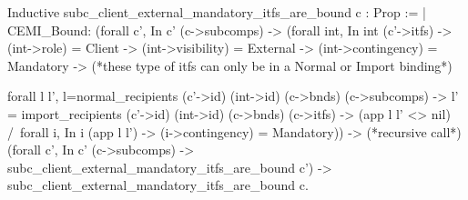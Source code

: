 Inductive subc_client_external_mandatory_itfs_are_bound c : Prop :=
 | CEMI_Bound: 
 (forall c', In c' (c->subcomps) -> 
  (forall int, In int (c'->itfs) -> (int->role) = Client ->
  (int->visibility) = External -> (int->contingency) = Mandatory ->
  (*these type of itfs can only be in a Normal or Import binding*)
  
  forall l l',
   l=normal_recipients (c'->id) (int->id) (c->bnds) (c->subcomps) ->
   l' = import_recipients (c'->id) (int->id)  (c->bnds) (c->itfs) ->
   (app l l' <> nil) /\
   forall i, In i (app l l') -> (i->contingency) = Mandatory))     ->
  (*recursive call*)
  (forall c', In c' (c->subcomps) -> 
           subc_client_external_mandatory_itfs_are_bound c')       ->
  subc_client_external_mandatory_itfs_are_bound c.